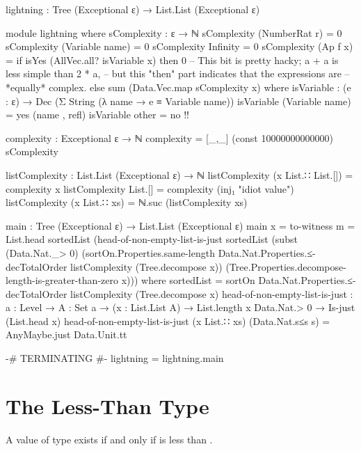 \documentclass{report}
\begin{document}
\begin{code}
  lightning : Tree (Exceptional ε) →
              List.List (Exceptional ε)

  module lightning where
    sComplexity : ε → ℕ
    sComplexity (NumberRat r) = 0
    sComplexity (Variable name) = 0
    sComplexity Infinity = 0
    sComplexity (Ap f x) =
      if isYes (AllVec.all? isVariable x)
         then 0 -- This bit is pretty hacky; a + a is less simple than 2 * a,
                -- but this "then" part indicates that the expressions are
                -- *equally* complex.
         else sum (Data.Vec.map sComplexity x)
        where
        isVariable : (e : ε) → Dec (Σ String (λ name → e ≡ Variable name))
        isVariable (Variable name) = yes (name , refl)
        isVariable other = no {!!}

    complexity : Exceptional ε → ℕ
    complexity = [_,_] (const 10000000000000) sComplexity

    listComplexity : List.List (Exceptional ε) → ℕ
    listComplexity (x List.∷ List.[]) = complexity x
    listComplexity List.[] = complexity (inj₁ "idiot value")
    listComplexity (x List.∷ xs) = ℕ.suc (listComplexity xs)

    main : Tree (Exceptional ε) → List.List (Exceptional ε)
    main x = to-witness {m = List.head sortedList}
                        (head-of-non-empty-list-is-just
                          sortedList
                          (subst (Data.Nat._> 0)
                                 (sortOn.Properties.same-length
                                    Data.Nat.Properties.≤-decTotalOrder
                                    listComplexity
                                    (Tree.decompose x))
                                 (Tree.Properties.decompose-length-is-greater-than-zero x)))
      where
      sortedList = sortOn Data.Nat.Properties.≤-decTotalOrder
                          listComplexity
                          (Tree.decompose x)
      head-of-non-empty-list-is-just :
        {a : Level} →
        {A : Set a} →
        (x : List.List A) →
        List.length x Data.Nat.> 0 →
        Is-just (List.head x)
      head-of-non-empty-list-is-just (x List.∷ xs) (Data.Nat.s≤s s) =
        AnyMaybe.just Data.Unit.tt

  {-# TERMINATING #-}
  lightning = lightning.main
\end{code}

\chapter{The Less-Than Type}
A value of type    exists if and only if  is less than .
\end{document}
